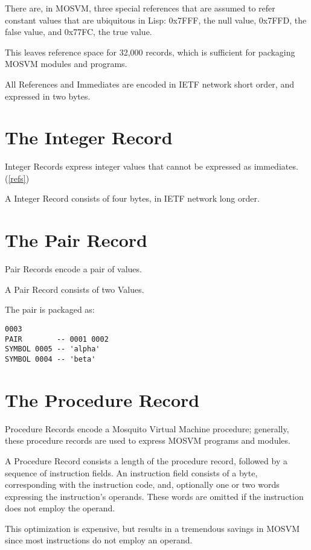 \documentclass[notitlepage,oneside]{book}
\begin{document}
There are, in MOSVM, three special references that are assumed to refer constant values that are ubiquitous in Lisp: 0x7FFF, the null value, 0x7FFD, the false value, and 0x77FC, the true value.

This leaves reference space for 32,000 records, which is sufficient for packaging MOSVM modules and programs.

All References and Immediates are encoded in IETF network short order, and expressed in two bytes.

\section{The Integer Record}
\label{int-record}

Integer Records express integer values that cannot be expressed as immediates. (\ref{refs}) 

A Integer Record consists of four bytes, in IETF network long order.  

\section{The Pair Record}
\label{pair-record}

Pair Records encode a pair of values.

A Pair Record consists of two Values.

The pair  is packaged as:
\begin{verbatim}
0003
PAIR        -- 0001 0002
SYMBOL 0005 -- 'alpha'
SYMBOL 0004 -- 'beta'
\end{verbatim}

\section{The Procedure Record}
\label{proc-record}

Procedure Records encode a Mosquito Virtual Machine procedure; generally, these procedure records are used to express MOSVM programs and modules.  

A Procedure Record consists a length of the procedure record, followed by a sequence of instruction fields.  An instruction field consists of a byte, corresponding with the instruction code, and, optionally one or two words expressing the instruction's operands.  These words are omitted if the instruction does not employ the operand.

This optimization is expensive, but results in a tremendous savings in MOSVM since most instructions do not employ an operand.
\end{document}
